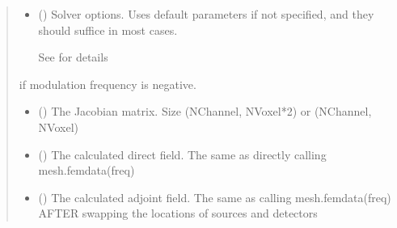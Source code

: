 \documentclass[letterpaper,10pt,english]{sphinxmanual}
\begin{document}
\begin{fulllineitems}
\begin{fulllineitems}
\begin{quote}
\begin{description}
\begin{itemize}
\item {} 
\sphinxAtStartPar
{} ({\hyperref[\detokenize{_autosummary/nirfasterff.utils.SolverOptions:nirfasterff.utils.SolverOptions}]{}}\sphinxstyleliteralemphasis{\sphinxupquote{, }}) \textendash{} 
\sphinxAtStartPar
Solver options. Uses default parameters if not specified, and they should suffice in most cases.

\sphinxAtStartPar
See {\hyperref[\detokenize{_autosummary/nirfasterff.utils.SolverOptions:nirfasterff.utils.SolverOptions}]{}} for details


\end{itemize}

\sphinxAtStartPar
{} \textendash{} if modulation frequency is negative.

\sphinxAtStartPar
\begin{itemize}
\item {} 
\sphinxAtStartPar
{} () \textendash{} The Jacobian matrix. Size (NChannel, NVoxel*2) or (NChannel, NVoxel)

\item {} 
\sphinxAtStartPar
{} () \textendash{} The calculated direct field. The same as directly calling mesh.femdata(freq)

\item {} 
\sphinxAtStartPar
{} () \textendash{} The calculated adjoint field. The same as calling mesh.femdata(freq) AFTER swapping the locations of sources and detectors

\end{itemize}


\end{description}\end{quote}

\end{fulllineitems}



\end{fulllineitems}
\end{document}

